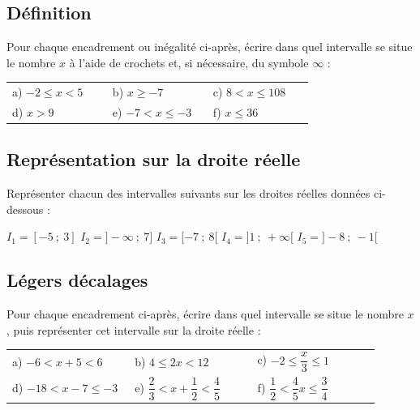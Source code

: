 \documentclass[oneside,12pt]{article}          %
\begin{document}
\subsection{Définition}
Pour chaque encadrement ou inégalité ci-après, écrire dans quel intervalle se situe le nombre $x$ à l'aide de crochets et, si nécessaire, du symbole $\infty$ :

\renewcommand{\arraystretch}{1.75}
\begin{tabular}{p{0.3\linewidth} p{0.3\linewidth} p{0.3\linewidth}}
	a) $-2\leq x <5$ & b) $x\geq-7$ & c) $8<x\leq108$ \\
	d) $x>9$ & e) $-7<x\leq-3$ & f) $x\leq36$
\end{tabular}



\subsection{Représentation sur la droite réelle}
Représenter chacun des intervalles suivants sur les droites réelles données ci-dessous :

$I_1 = [-5 ~;~ 3]$ \qquad $I_2 = ]-\infty  ~;~  7]$ \qquad $I_3 = [-7  ~;~  8[$ \qquad $I_4 = ]1  ~;~  +\infty [$ \qquad $I_5 = ]-8  ~;~ -1 [$ \\[10pt]




\subsection{Légers décalages}
Pour chaque encadrement ci-après, écrire dans quel intervalle se situe le nombre $x$, puis représenter cet intervalle sur la droite réelle :

\renewcommand{\arraystretch}{2}
\begin{tabular}{p{0.3\linewidth} p{0.3\linewidth} p{0.3\linewidth}}
	a) $-6<x+5 < 6$ & b) $4 \leq 2x < 12$ & c) $-2 \leq \dfrac{x}{3} \leq 1$ \\
	d) $-18 < x-7 \leq -3$ & e) $\dfrac{2}{3} < x + \dfrac{1}{2} < \dfrac{4}{5}$ & f) $\dfrac{1}{2} < \dfrac{4}{5}x \leq \dfrac{3}{4}$
\end{tabular}
\end{document}
